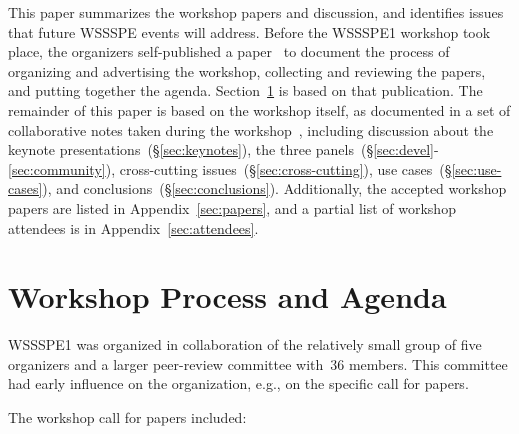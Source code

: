 \documentclass[11pt, oneside]{amsart}
\begin{document}
This paper summarizes the  workshop papers
and discussion, and identifies issues that future WSSSPE events will address.
Before the WSSSPE1 workshop took place, the organizers self-published
a paper~\cite{WSSSPE1-pre-report} to document the process of
organizing and advertising the workshop, collecting and reviewing the
papers, and putting together the agenda. Section~\ref{sec:process} is
based on that publication. The remainder of this paper is based on the
workshop itself, as documented in a set of collaborative notes taken
during the workshop~\cite{WSSSPE1-google-notes}, including discussion
about the keynote presentations~(\S\ref{sec:keynotes}), the three
panels~(\S\ref{sec:devel}-\ref{sec:community}),
cross-cutting issues~(\S\ref{sec:cross-cutting}),
use cases~(\S\ref{sec:use-cases}), and conclusions~(\S\ref{sec:conclusions}).
Additionally, the accepted workshop papers are listed in
Appendix~\ref{sec:papers}, and a partial list of workshop attendees is
in Appendix~\ref{sec:attendees}.


\section{Workshop Process and Agenda} \label{sec:process}

WSSSPE1 was organized in collaboration of the relatively small group
of five organizers and a larger peer-review committee with~36
members. This committee had early influence on the organization, e.g.,
on the specific call for papers.

The workshop call for papers included:
\end{document}
